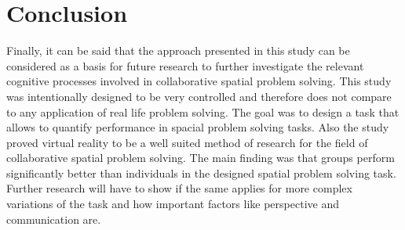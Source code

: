 \section{Conclusion}\label{conclusion}
Finally, it can be said that the approach presented in this study can be considered as a basis for future research to further investigate the relevant cognitive processes involved in collaborative spatial problem solving. This study was intentionally designed to be very controlled and therefore does not compare to any application of real life problem solving. The goal was to design a task that allows to quantify performance in spacial problem solving tasks. Also the study proved virtual reality to be a well suited method of research for the field of collaborative spatial problem solving. The main finding was that groups perform significantly better than individuals in the designed spatial problem solving task. Further research will have to show if the same applies for more complex variations of the task and how important factors like perspective and communication are.